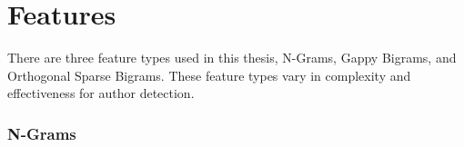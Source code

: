 \section {Features}
\begin{comment}
\paragraph*{} For this thesis, it is necessary to carefully distinguish between types of features, types, and tokens.  For purposes of brevity, types of features will be called ``feature types" in this thesis.  Types are the distinct items within data.  Feature types are the structure used to determine what constitutes a distinct item. Tokens are the count for each type encountered within the data.
\paragraph*{} For the phrase ``the quick brown fox" each word can be considered a type if the feature type is a single word.  ``the", ``quick", ``brown" and ``fox" are types within the data ``the quick brown fox".  ``the 1", ``quick 1", ``brown 1", and ``fox 1" would be tokens -- a type accompanied by its count. A type would be the each distinct letter if the feature type was individual characters.  For the individual character feature type, the type ``t" would have only one token of ``t" encountered in ``the quick brown fox".  The specific feature types used in this thesis are described in detail in the following sections.

	\subsection {Feature Types}
	\paragraph{} Feature types for natural language processing can be as simple as keeping counts of individual characters within a document to complex tracking of word combinations.  \end{comment} There are three feature types used in this thesis, N-Grams, Gappy Bigrams, and Orthogonal Sparse Bigrams.  These feature types vary in complexity and effectiveness for author detection.

	\subsubsection {N-Grams}
